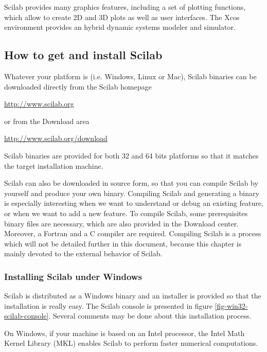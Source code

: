 Scilab provides many graphics features, including a set 
of plotting functions, which allow to create 2D and 3D plots as well 
as user interfaces.
The Xcos environment provides an hybrid dynamic systems modeler and simulator.

\subsection{How to get and install Scilab}
\label{introscilab-getinstalscilab}

Whatever your platform is (i.e. Windows, Linux or Mac), Scilab
binaries can be downloaded directly from the Scilab homepage 
\begin{center}
\url{http://www.scilab.org}
\end{center}

or from the Download area 
\begin{center}
\url{http://www.scilab.org/download}
\end{center}

Scilab binaries are provided for both 32 and 64 bits platforms so that it 
matches the target installation machine.

Scilab can also be downloaded in source form, so that you can 
compile Scilab by yourself and produce your own binary. 
Compiling Scilab and generating a binary is especially interesting
when we want to understand or debug an existing feature, or when 
we want to add a new feature.
To compile Scilab, some prerequisites binary files are necessary, which 
are also provided in the Download center. Moreover, a Fortran and 
a C compiler are required. Compiling Scilab is a process which 
will not be detailed further in this document, because this chapter 
is mainly devoted to the external behavior of Scilab.

\subsubsection{Installing Scilab under Windows}

Scilab is distributed as a Windows binary and an installer is provided
so that the installation is really easy.
The Scilab console is presented in figure \ref{fig-win32-scilab-console}. 
Several comments may be done about this installation process. 

On Windows, if your machine is based on an Intel processor, the Intel 
Math Kernel Library (MKL) \cite{IntelMKLWWW} enables Scilab to perform 
faster numerical computations. 

